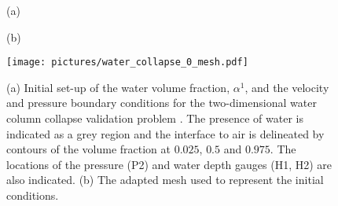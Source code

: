 \begin{figure}[tbp]
\hspace{1cm}(a)
\begin{center}

\end{center}
\hspace{1cm}(b)
\begin{center}
\texttt{[image: pictures/water\_collapse\_0\_mesh.pdf]}
\end{center}
\caption{(a) Initial set-up of the water volume fraction, $\alpha^1$, and the velocity and pressure boundary conditions for the two-dimensional water column collapse validation problem \citep{zhou_nonlinear_1999}. The presence of water is indicated as a grey region and the interface to air is delineated by contours of the volume fraction at $0.025$, $0.5$ and $0.975$.  The locations of the pressure (P2) and water depth gauges (H1, H2) are also indicated. (b) The adapted mesh used to represent the initial conditions.}
\label{fig:zhouinitial}
\end{figure}

